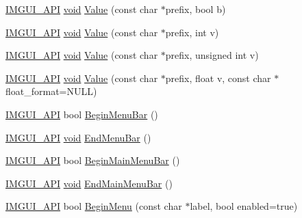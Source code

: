 \begin{DoxyCompactItemize}
\item 
\hyperlink{imgui_8h_a43829975e84e45d1149597467a14bbf5}{I\+M\+G\+U\+I\+\_\+\+A\+PI} \hyperlink{imgui__impl__opengl3__loader_8h_ac668e7cffd9e2e9cfee428b9b2f34fa7}{void} \hyperlink{namespaceImGui_a1b3324308e43eeded5c3599fa0f03e85}{Value} (const char $\ast$prefix, bool b)
\item 
\hyperlink{imgui_8h_a43829975e84e45d1149597467a14bbf5}{I\+M\+G\+U\+I\+\_\+\+A\+PI} \hyperlink{imgui__impl__opengl3__loader_8h_ac668e7cffd9e2e9cfee428b9b2f34fa7}{void} \hyperlink{namespaceImGui_a654ceb70f2dd1598f88861f54764ee08}{Value} (const char $\ast$prefix, int v)
\item 
\hyperlink{imgui_8h_a43829975e84e45d1149597467a14bbf5}{I\+M\+G\+U\+I\+\_\+\+A\+PI} \hyperlink{imgui__impl__opengl3__loader_8h_ac668e7cffd9e2e9cfee428b9b2f34fa7}{void} \hyperlink{namespaceImGui_aec80a3e35bf7c1ff5704334e5a3ebd5a}{Value} (const char $\ast$prefix, unsigned int v)
\item 
\hyperlink{imgui_8h_a43829975e84e45d1149597467a14bbf5}{I\+M\+G\+U\+I\+\_\+\+A\+PI} \hyperlink{imgui__impl__opengl3__loader_8h_ac668e7cffd9e2e9cfee428b9b2f34fa7}{void} \hyperlink{namespaceImGui_a0c8b87438082a1d0a46ae2a76090ca16}{Value} (const char $\ast$prefix, float v, const char $\ast$float\+\_\+format=N\+U\+LL)
\item 
\hyperlink{imgui_8h_a43829975e84e45d1149597467a14bbf5}{I\+M\+G\+U\+I\+\_\+\+A\+PI} bool \hyperlink{namespaceImGui_a4852dff802922163fc747e2e0df5b88f}{Begin\+Menu\+Bar} ()
\item 
\hyperlink{imgui_8h_a43829975e84e45d1149597467a14bbf5}{I\+M\+G\+U\+I\+\_\+\+A\+PI} \hyperlink{imgui__impl__opengl3__loader_8h_ac668e7cffd9e2e9cfee428b9b2f34fa7}{void} \hyperlink{namespaceImGui_aa226265c140eb6ee375c5b9abc69c4fc}{End\+Menu\+Bar} ()
\item 
\hyperlink{imgui_8h_a43829975e84e45d1149597467a14bbf5}{I\+M\+G\+U\+I\+\_\+\+A\+PI} bool \hyperlink{namespaceImGui_a55cb9cfb9865204ac6fb21c965784f78}{Begin\+Main\+Menu\+Bar} ()
\item 
\hyperlink{imgui_8h_a43829975e84e45d1149597467a14bbf5}{I\+M\+G\+U\+I\+\_\+\+A\+PI} \hyperlink{imgui__impl__opengl3__loader_8h_ac668e7cffd9e2e9cfee428b9b2f34fa7}{void} \hyperlink{namespaceImGui_ab92f330c808546b340eb7bdf7e5f7c95}{End\+Main\+Menu\+Bar} ()
\item 
\hyperlink{imgui_8h_a43829975e84e45d1149597467a14bbf5}{I\+M\+G\+U\+I\+\_\+\+A\+PI} bool \hyperlink{namespaceImGui_a1e55711a21f97d5dff919d697d3a7201}{Begin\+Menu} (const char $\ast$label, bool enabled=true)

\end{DoxyCompactItemize}

